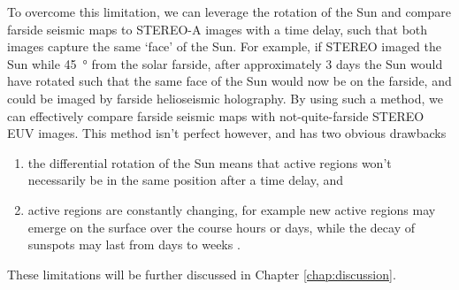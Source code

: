 \documentclass[11pt,a4paper,onecolumn]{report}
\begin{document}
To overcome this limitation, we can leverage the rotation of the Sun and compare
farside seismic maps to STEREO-A images with a time delay, such that both images
capture the same `face' of the Sun. For example, if STEREO imaged the Sun while
\SI[]{45}[]{\degree} from the solar farside, after approximately 3 days the Sun
would have rotated such that the same face of the Sun would now be on the
farside, and could be imaged by farside helioseismic holography. By using such a
method, we can effectively compare farside seismic maps with not-quite-farside
STEREO EUV images. This method isn't perfect however, and has two obvious drawbacks
\begin{enumerate}
  \item the differential rotation of the Sun means that active regions won't
  necessarily be in the same position after a time delay, and
  \item active regions are constantly changing, for example new active regions
  may emerge on the surface over the course hours or days, while the decay of
  sunspots may last from days to weeks
  \citep{van_driel-gesztelyi_evolution_2015}.
\end{enumerate}
These limitations will be further discussed in Chapter \ref{chap:discussion}. \\
\end{document}
